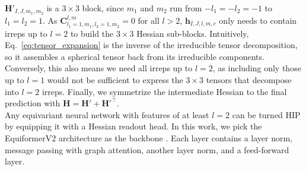 \documentclass[pdflatex,sn-mathphys-num]{sn-jnl}%
\begin{document}
$\mathbf{H}'_{I,J,m_1,m_2}$ is a $3\times3$ block, since $m_1$ and $m_2$ run from $-l_1=-l_2=-1$ to $l_1=l_2=1$. As $\mathbf{C}^{l,m}_{l_1=1,m_1,l_2=1,m_2} = 0$ for all $l>2$, $\mathbf{h}_{I, J,l,m,c}$ only needs to contain irreps up to $l=2$ to build the $3\times3$ Hessian sub-blocks. Intuitively, Eq.~\eqref{eq:tensor_expansion} is the inverse of the irreducible tensor decomposition, so it assembles a spherical tensor back from its irreducible components. Conversely, this also means we need all irreps up to $l=2$, as including only those up to $l=1$ would not be sufficient to express the $3\times3$ tensors that decompose into $l=2$ irreps.
Finally, we symmetrize the intermediate Hessian to the final prediction with $\mathbf{H}=\mathbf{H}' + \mathbf{H}'^\top$.\\
Any equivariant neural network \citep{duvalHitchhikerGuideGeometric2024a} with features of at least $l=2$ can be turned HIP by equipping it with a Hessian readout head. In this work, we pick the EquiformerV2 architecture as the backbone \citep{liao2023equiformerv2}. Each layer contains a layer norm, message passing with graph attention, another layer norm, and a feed-forward layer. 
\end{document}
